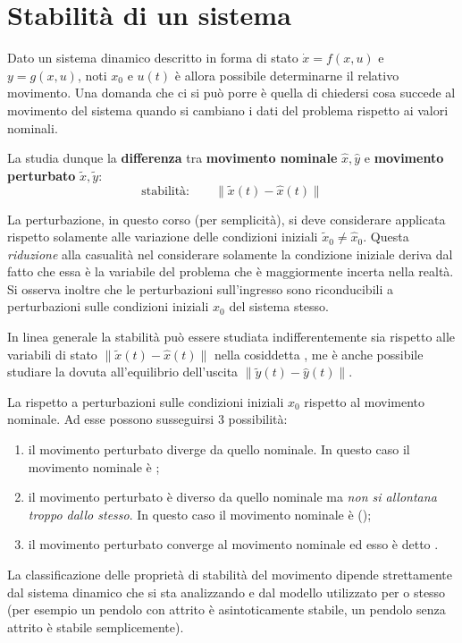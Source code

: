 \section{Stabilità di un sistema}
	Dato un sistema dinamico descritto in forma di stato $\dot x = f(x,u)$ e $y = g(x,u)$, noti $x_0$ e $u(t)$ è allora possibile determinarne il relativo movimento. Una domanda che ci si può porre è quella di chiedersi cosa succede al movimento del sistema quando si cambiano i dati del problema rispetto ai valori nominali.
	
	La  studia dunque la \textbf{differenza} tra \textbf{movimento nominale} $\hat x, \hat y$ e \textbf{movimento perturbato} $\tilde x, \tilde y$:
	\[\textrm{stabilità:} \qquad \| \tilde x(t) - \hat x(t) \|\]
	
	La perturbazione, in questo corso (per semplicità), si deve considerare applicata rispetto solamente alle variazione delle condizioni iniziali $\tilde x_0 \neq \hat x_0$. 
	Questa \textit{riduzione} alla casualità nel considerare solamente la condizione iniziale deriva dal fatto che essa è la variabile del problema che è maggiormente incerta nella realtà. Si osserva inoltre che le perturbazioni sull'ingresso sono riconducibili a perturbazioni sulle condizioni iniziali $x_0$ del sistema stesso.
	
	In linea generale la stabilità può essere studiata indifferentemente sia rispetto alle variabili di stato $\|\tilde x(t) - \hat x(t)\|$ nella cosiddetta , me è anche possibile studiare la  dovuta all'equilibrio dell'uscita $\|\tilde y(t) - \hat y(t) \|$.
	\begin{concetto}
		La  rispetto a perturbazioni sulle condizioni iniziali $x_0$ rispetto al movimento nominale. Ad esse possono susseguirsi 3 possibilità:
		\begin{enumerate}
			\item il movimento perturbato diverge da quello nominale. In questo caso il movimento nominale è ;
			\item il movimento perturbato è diverso da quello nominale ma \textit{non si allontana troppo dallo stesso}. In questo caso il movimento nominale è  ();
			\item il movimento perturbato converge al movimento nominale ed esso è detto .
		\end{enumerate}
	
	\end{concetto}
	La classificazione delle proprietà di stabilità del movimento dipende strettamente dal sistema dinamico che si sta analizzando e dal modello utilizzato per o stesso (per esempio un pendolo con attrito è asintoticamente stabile, un pendolo senza attrito è stabile semplicemente).
	

